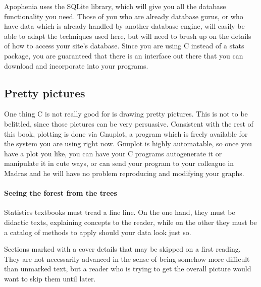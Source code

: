 \documentclass[12pt,notitlepage, openany]{book}
\def\treesymbol{\maltese}
\def\ind#1{\index{#1}#1}
\begin{document}
Apophenia  uses the \ind{SQLite} library, which will
give you all the database functionality you need. Those of you who are
already database gurus, or who have data which is already handled
by another database engine, will easily be able to adapt the techniques
used here, but will need to brush up on the details of how to access
your site's database. Since you are using C instead of a stats package,
you are guaranteed that there is an interface out there that you can
download and incorporate into your programs.

\subsection{Pretty pictures} One thing C is not really good for is drawing
pretty pictures. This is not to be belittled, since those pictures
can be very persuasive. Consistent with the rest of this book, plotting
is done via \ind{Gnuplot}, a program which is freely available for
the system you are using right now. Gnuplot is highly automatable, so once
you have a plot you like, you can have your C programs autogenerate
it or manipulate it in cute ways, or can send your program to your
colleague in Madras and he will have no problem reproducing and modifying
your graphs.

\paragraph{Seeing the forest from the trees} Statistics textbooks must tread a fine
line. On the one hand, they must be didactic texts, explaining concepts
to the reader, while on the other they must be a catalog of methods to
apply should your data look just so.

Sections marked with a \ind{\treesymbol} cover details that may be
skipped on a first reading. They are not necessarily advanced
in the sense of being somehow more difficult than unmarked text, but a
reader who is trying to get the overall picture would want to skip them
until later. 


\end{document}

